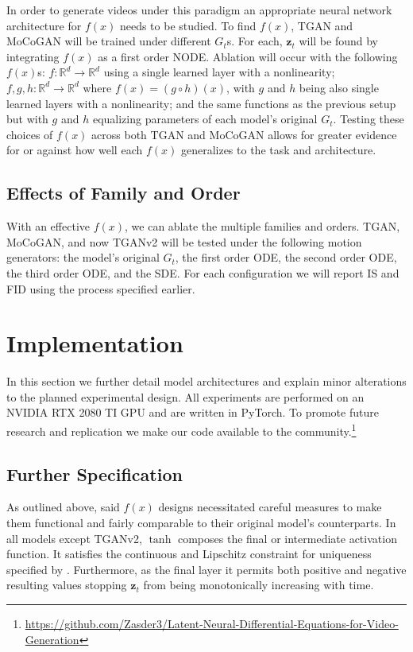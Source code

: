 \documentclass[tablecaption=bottom,pmlr]{jmlr}
\begin{document}
In order to generate videos under this paradigm an appropriate neural network architecture for $f(x)$ needs to be studied. To find $f(x)$, TGAN and MoCoGAN will be trained under different $G_t$s. For each, $\mathbf{z}_t$ will be found by integrating $f(x)$ as a first order NODE. Ablation will occur with the following $f(x)$s: $f:\mathbb{R}^d\to\mathbb{R}^d$ using a single learned layer with a nonlinearity; $f,g,h:\mathbb{R}^d\to\mathbb{R}^d$ where $f(x)=(g \circ h)(x)$, with $g$
and $h$ being also single learned layers with a nonlinearity; and the same functions as the previous setup but with $g$ and $h$ equalizing parameters of each model's original $G_t$. Testing these choices of $f(x)$
across both TGAN and MoCoGAN allows for greater evidence for or against how well each $f(x)$ generalizes to the task and architecture.

\subsection{Effects of Family and Order}

With an effective $f(x)$, we can ablate the multiple families and orders. TGAN, MoCoGAN, and now TGANv2 will be tested under the following motion generators: the model's original $G_t$, the first order ODE, the second order ODE, the third order ODE, and the SDE. For each configuration we will report IS and FID using the process specified earlier.

\section{Implementation}

In this section we further detail model architectures and explain minor alterations to the planned experimental design. All experiments are performed on an NVIDIA RTX 2080 TI GPU and are written in PyTorch. To promote future research and replication we make our code available to the community.\footnote{\url{https://github.com/Zasder3/Latent-Neural-Differential-Equations-for-Video-Generation}}

\subsection{Further Specification}

As outlined above, said $f(x)$ designs necessitated careful measures to make them functional and fairly comparable to their original model's counterparts. In all models except TGANv2, $\tanh$ composes the final or intermediate activation function. It satisfies the continuous and Lipschitz constraint for uniqueness specified by \citet{neuralode}. Furthermore, as the final layer it permits both positive and negative resulting values stopping $\mathbf{z}_t$ from being monotonically increasing with time.
\end{document}
